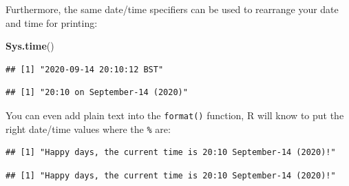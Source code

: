 \documentclass[
  12pt,
  krantz2]{krantz}
\makeatletter
\newenvironment{Shaded}{\begin{snugshade}}{\end{snugshade}}
\newcommand{\KeywordTok}[1]{\textcolor[rgb]{0.13,0.29,0.53}{\textbf{#1}}}
\newcommand{\NormalTok}[1]{#1}
\newcommand{\OperatorTok}[1]{\textcolor[rgb]{0.81,0.36,0.00}{\textbf{#1}}}
\newcommand{\StringTok}[1]{\textcolor[rgb]{0.31,0.60,0.02}{#1}}
\newenvironment{kframe}{%
\medskip{}
\setlength{\fboxsep}{.8em}
 \def\at@end@of@kframe{}%
 \ifinner\ifhmode%
  \def\at@end@of@kframe{\end{minipage}}%
  \begin{minipage}{\columnwidth}%
 \fi\fi%
 \def\FrameCommand##1{\hskip\@totalleftmargin \hskip-\fboxsep
 \colorbox{shadecolor}{##1}\hskip-\fboxsep
     \hskip-\linewidth \hskip-\@totalleftmargin \hskip\columnwidth}%
 \MakeFramed {\advance\hsize-\width
   \@totalleftmargin\z@ \linewidth\hsize
   \@setminipage}}%
 {\par\unskip\endMakeFramed%
 \at@end@of@kframe}
\renewenvironment{Shaded}{\begin{kframe}}{\end{kframe}}
\makeatother
\begin{document}
Furthermore, the same date/time specifiers can be used to rearrange your date and time for printing:

\begin{Shaded}
\begin{Highlighting}[]
\KeywordTok{Sys.time}\NormalTok{()}
\end{Highlighting}
\end{Shaded}

\begin{verbatim}
## [1] "2020-09-14 20:10:12 BST"
\end{verbatim}

\begin{Shaded}
\end{Shaded}

\begin{verbatim}
## [1] "20:10 on September-14 (2020)"
\end{verbatim}

You can even add plain text into the \texttt{format()} function, R will know to put the right date/time values where the \texttt{\%} are:

\begin{Shaded}
\end{Shaded}

\begin{verbatim}
## [1] "Happy days, the current time is 20:10 September-14 (2020)!"
\end{verbatim}

\begin{Shaded}
\end{Shaded}

\begin{verbatim}
## [1] "Happy days, the current time is 20:10 September-14 (2020)!"
\end{verbatim}
\end{document}
